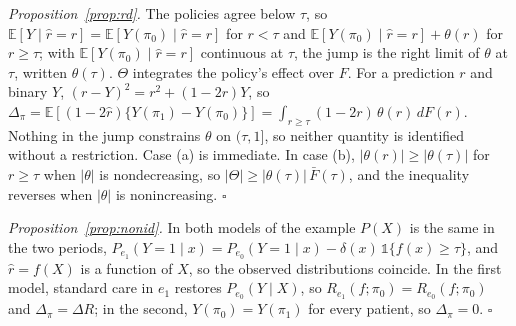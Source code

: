 \documentclass[letterpaper]{article} %
\newcommand{\E}{\mathbb{E}}
\newcommand{\rhat}{\hat r}
\begin{document}
\emph{Proposition~\ref{prop:rd}.} The policies agree below $\tau$, so
$\E[Y \mid \rhat = r] = \E[Y(\pi_0) \mid \rhat = r]$ for $r < \tau$ and
$\E[Y(\pi_0) \mid \rhat = r] + \theta(r)$ for $r \geq \tau$; with
$\E[Y(\pi_0) \mid \rhat = r]$ continuous at $\tau$, the jump is the right limit
of $\theta$ at $\tau$, written $\theta(\tau)$. $\Theta$ integrates the policy's
effect over $F$. For a prediction $r$ and binary $Y$,
$(r - Y)^2 = r^2 + (1 - 2r) Y$, so
$\Delta_\pi = \E[(1 - 2\rhat)\{Y(\pi_1) - Y(\pi_0)\}] =
\int_{r \geq \tau} (1 - 2r)\, \theta(r)\, dF(r)$. Nothing in the jump constrains
$\theta$ on $(\tau, 1]$, so neither quantity is identified without a
restriction. Case (a) is immediate. In case (b), $|\theta(r)| \geq
|\theta(\tau)|$ for $r \geq \tau$ when $|\theta|$ is nondecreasing, so
$|\Theta| \geq |\theta(\tau)|\, \bar F(\tau)$, and the inequality reverses when
$|\theta|$ is nonincreasing. $\square$

\emph{Proposition~\ref{prop:nonid}.} In both models of the example $P(X)$ is
the same in the two periods, $P_{e_1}(Y{=}1 \mid x) = P_{e_0}(Y{=}1 \mid x) -
\delta(x)\, \mathbb{1}\{f(x) \geq \tau\}$, and $\rhat = f(X)$ is a function of
$X$, so the observed distributions coincide. In the first model, standard care
in $e_1$ restores $P_{e_0}(Y \mid X)$, so $R_{e_1}(f; \pi_0) =
R_{e_0}(f; \pi_0)$ and $\Delta_\pi = \Delta R$; in the second,
$Y(\pi_0) = Y(\pi_1)$ for every patient, so $\Delta_\pi = 0$. $\square$
\end{document}
